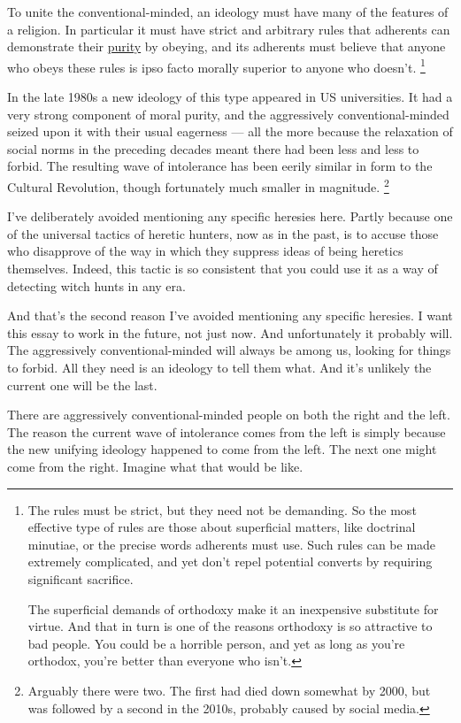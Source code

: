 \documentclass[12pt]{book}
\begin{document}
To unite the conventional-minded, an ideology must have many of the
features of a religion. In particular it must have strict and arbitrary
rules that adherents can demonstrate their
\href{https://www.youtube.com/watch?v=qaHLd8de6nM}{purity} by obeying,
and its adherents must believe that anyone who obeys these rules is ipso
facto morally superior to anyone who doesn't. \footnote{The rules must be strict, but they need not be demanding. So the
most effective type of rules are those about superficial matters, like
doctrinal minutiae, or the precise words adherents must use. Such rules
can be made extremely complicated, and yet don't repel potential
converts by requiring significant sacrifice.

The superficial demands of orthodoxy make it an inexpensive substitute
for virtue. And that in turn is one of the reasons orthodoxy is so
attractive to bad people. You could be a horrible person, and yet as
long as you're orthodox, you're better than everyone who isn't.}

In the late 1980s a new ideology of this type appeared in US
universities. It had a very strong component of moral purity, and the
aggressively conventional-minded seized upon it with their usual
eagerness --- all the more because the relaxation of social norms in the
preceding decades meant there had been less and less to forbid. The
resulting wave of intolerance has been eerily similar in form to the
Cultural Revolution, though fortunately much smaller in magnitude.
\footnote{Arguably there were two. The first had died down somewhat by
2000, but was followed by a second in the 2010s, probably caused by
social media.}

I've deliberately avoided mentioning any specific heresies here. Partly
because one of the universal tactics of heretic hunters, now as in the
past, is to accuse those who disapprove of the way in which they
suppress ideas of being heretics themselves. Indeed, this tactic is so
consistent that you could use it as a way of detecting witch hunts in
any era.

And that's the second reason I've avoided mentioning any specific
heresies. I want this essay to work in the future, not just now. And
unfortunately it probably will. The aggressively conventional-minded
will always be among us, looking for things to forbid. All they need is
an ideology to tell them what. And it's unlikely the current one will be
the last.

There are aggressively conventional-minded people on both the right and
the left. The reason the current wave of intolerance comes from the left
is simply because the new unifying ideology happened to come from the
left. The next one might come from the right. Imagine what that would be
like.
\end{document}

